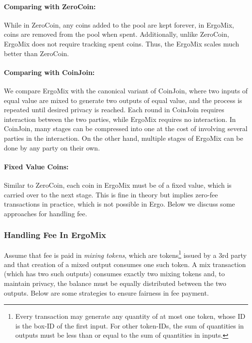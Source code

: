 \documentclass[11pt]{article}
\newcommand{\mixname}{ErgoMix\xspace}
\begin{document}
\paragraph{Comparing with ZeroCoin:} While in ZeroCoin, any coins added to the pool are kept forever, in \mixname, coins are removed from the pool when spent. Additionally, unlike ZeroCoin, \mixname does not require tracking spent coins. Thus, the \mixname scales much better than ZeroCoin. 

\paragraph{Comparing with CoinJoin:} We compare \mixname with the canonical variant of CoinJoin, where two inputs of equal value are mixed to generate two outputs of equal value, and the process is repeated until desired privacy is reached. Each round in CoinJoin requires interaction between the two parties, while \mixname requires no interaction. In CoinJoin, many stages can be compressed into one at the cost of involving several parties in the interaction. On the other hand, multiple stages of \mixname can be done by any party on their own. 


\paragraph{Fixed Value Coins:} 
Similar to ZeroCoin, each coin in \mixname must be of a fixed value, which is carried over to the next stage.
This is fine in theory but implies zero-fee transactions in practice, which is not possible in Ergo. Below we discuss some approaches for handling fee. 

\subsubsection{Handling Fee In \mixname}
Assume that fee is paid in {\em mixing tokens}, which are tokens\footnote{Every transaction may generate any quantity of at most one token, whose ID is the box-ID of the first input. For other token-IDs, the sum of quantities in outputs must be less than or equal to the sum of quantities in inputs.} issued by a 3rd party and that creation of a mixed output consumes one such token. A mix transaction (which has two such outputs) consumes exactly two mixing tokens and, to maintain privacy, the balance must be equally distributed between the two outputs. Below are some strategies to ensure fairness in fee payment. 
\end{document}
